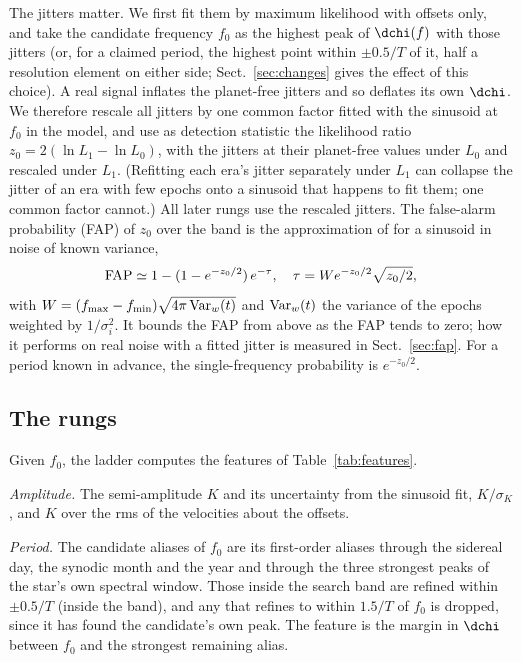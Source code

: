 The jitters matter. We first fit them by maximum likelihood with offsets only, and
take the candidate frequency $f_0$ as the highest peak of $\dchi(f)$ with those
jitters (or, for a claimed period, the highest point within $\pm0.5/T$ of it, half a
resolution element on either side; Sect.~\ref{sec:changes} gives the effect of this
choice). A real
signal inflates the planet-free jitters and so deflates its own $\dchi$. We therefore
rescale all jitters by one common factor fitted with the sinusoid at $f_0$ in the
model, and use as detection statistic the likelihood ratio
$z_0 = 2(\ln L_1 - \ln L_0)$, with the jitters at their planet-free values under $L_0$
and rescaled under $L_1$. (Refitting each era's jitter separately under $L_1$ can
collapse the jitter of an era with few epochs onto a sinusoid that happens to fit
them; one common factor cannot.) All later rungs use the rescaled jitters. The
false-alarm probability (FAP) of $z_0$ over the band is the approximation of
\citet{Baluev2008} for a sinusoid in noise of known variance,
\begin{equation}
{\rm FAP} \simeq 1 - (1 - e^{-z_0/2})\,e^{-\tau}, \quad
\tau = W e^{-z_0/2}\sqrt{z_0/2},
\end{equation}
with $W = (f_{\max} - f_{\min})\sqrt{4\pi\,{\rm Var}_w(t)}$ and ${\rm Var}_w(t)$ the
variance of the epochs weighted by $1/\sigma_i^2$. It bounds the FAP from above as the
FAP tends to zero; how it performs on real noise with a fitted jitter is measured in
Sect.~\ref{sec:fap}. For a period known in advance, the single-frequency probability
is $e^{-z_0/2}$.

\subsection{The rungs}

Given $f_0$, the ladder computes the features of Table~\ref{tab:features}.

\emph{Amplitude.} The semi-amplitude $K$ and its uncertainty from the sinusoid fit,
$K/\sigma_K$, and $K$ over the rms of the velocities about the offsets.

\emph{Period.} The candidate aliases of $f_0$ are its first-order aliases through
the sidereal day, the synodic month and the year and through the three strongest
peaks of the star's own spectral window. Those inside the search band are refined
within $\pm 0.5/T$ (inside the band), and any that refines to within $1.5/T$ of $f_0$ is
dropped, since it has found the candidate's own peak. The feature is the margin in
$\dchi$ between $f_0$ and the strongest remaining alias.

